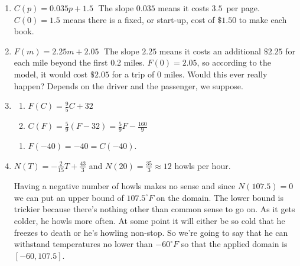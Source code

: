 \begin{enumerate}
\setcounter{enumi}{\value{HW}}

\item  $C(p) = 0.035p + 1.5 \;$  The slope $0.035$ means it costs $3.5$\textcent \, per page.  $C(0) = 1.5$ means there is a fixed, or start-up, cost of $\$1.50$ to make each book.

\item $F(m) = 2.25m + 2.05 \;$  The slope $2.25$ means it costs an additional $\$2.25$ for each mile beyond the first 0.2 miles.  $F(0) = 2.05$, so according to the model, it would cost $\$2.05$ for a trip of $0$ miles.  Would this ever really happen?  Depends on the driver and the passenger, we suppose.

\pagebreak

\item   \begin{multicols}{2}

\begin{enumerate}

\item $F(C) = \frac{9}{5}C + 32$
\item $C(F) = \frac{5}{9}(F - 32) = \frac{5}{9}F - \frac{160}{9}$

\setcounter{HWindent}{\value{enumii}}

\end{enumerate}

\end{multicols}

\begin{enumerate}
\setcounter{enumii}{\value{HWindent}}

\item $F(-40) = -40 = C(-40)$.

\end{enumerate}


\item $N(T) = -\frac{2}{15}T + \frac{43}{3}$  and $N(20) = \frac{35}{3} \approx 12$ howls per hour.

Having a negative number of howls makes no sense and since $N(107.5) = 0$ we can put an upper bound of $107.5^{\circ}F$ on the domain.  The lower bound is trickier because there's nothing other than common sense to go on.  As it gets colder, he howls more often.  At some point it will either be so cold that he freezes to death or he's howling non-stop.  So we're going to say that he can withstand temperatures no lower than $-60^{\circ}F$ so that the applied domain is $[-60, 107.5]$.



\end{enumerate}
